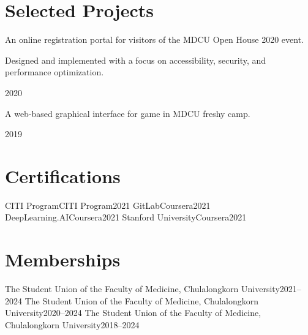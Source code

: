 \documentclass{cv}
\begin{document}
\section{Selected Projects}
\begin{cv_table}
  {\begin{cv_itemize}
      \item An online registration portal for visitors of the MDCU Open House 2020 event.
      \item Designed and implemented with a focus on accessibility, security, and performance optimization.
    \end{cv_itemize}
  }{}{2020}
  {\begin{cv_itemize}
      \item A web-based graphical interface for game in MDCU freshy camp.
    \end{cv_itemize}
  }{}{2019}
\end{cv_table}

\section{Certifications}
\begin{cv_table}
  {CITI Program}{CITI Program}{2021}
  {GitLab}{Coursera}{2021}
  {DeepLearning.AI}{Coursera}{2021}
  {Stanford University}{Coursera}{2021}
\end{cv_table}

\section{Memberships}
\begin{cv_table}
  {The Student Union of the Faculty of Medicine, Chulalongkorn University}{}{2021--2024}
  {The Student Union of the Faculty of Medicine, Chulalongkorn University}{}{2020--2024}
  {The Student Union of the Faculty of Medicine, Chulalongkorn University}{}{2018--2024}
\end{cv_table}
\end{document}
